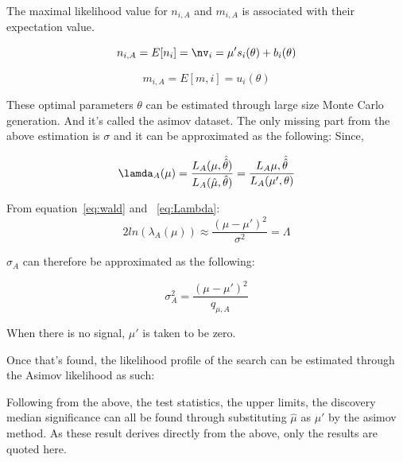 The maximal likelihood value for $n_{i,A}$ and $m_{i,A}$ is associated with their expectation value. 

\begin{equation}
 n_{i,A} = E[n_{i}] = \nv_{i} = \mu's_{i}(\theta) + b_{i}(\theta)
\end{equation}

\begin{equation}
m_{i,A} = E[m,i] = u_{i}(\theta)
\end{equation}


These optimal parameters $\theta$ can be estimated through large size Monte Carlo generation. And it's called the asimov dataset.
The only missing part from the above estimation is $\sigma$ and it can be approximated as the following: 
Since, 

\begin{equation}
    \lamda_{A}(\mu) = \frac{L_{A}(\mu, \hat{\hat{\theta}})}{L_{A}(\hat{\mu}, \hat{\theta})}
= \frac{L_{A}{\mu, \hat{\hat{\theta}}}}{L_{A}(\mu', \theta)}
\end{equation}


From equation~\ref{eq:wald} and ~\ref{eq:Lambda}:
\begin{equation}
2ln(\lambda_{A}(\mu)) \approx \frac{(\mu-\mu')^{2}}{\sigma^{2}}=\Lambda
\end{equation}

$\sigma_{A}$ can therefore be approximated as the following:

\begin{equation}
    \sigma_{A}^{2} = \frac{(\mu-\mu')^{2}}{q_{\mu,A}}
\end{equation}

When there is no signal, $\mu'$ is taken to be zero. 


Once that's found, the likelihood profile of the search can be estimated through the Asimov likelihood as such:

Following from the above, the test statistics, the upper limits, the discovery median significance can all be found through substituting $\hat{\mu}$ as $\mu'$ by the asimov method. As these result derives directly from the above, only the results are quoted here. 

